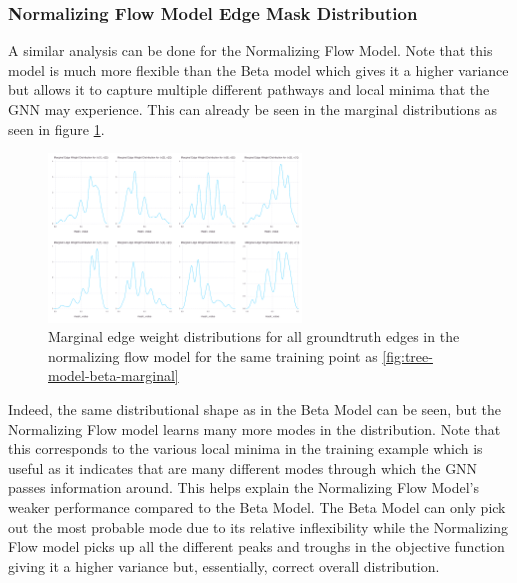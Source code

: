 \subsubsection{Normalizing Flow Model Edge Mask Distribution}
A similar analysis can be done for the Normalizing Flow Model. Note that this model is much more flexible than the Beta model which gives it a higher variance but allows it to capture multiple different pathways and local minima that the GNN may experience. This can already be seen in the marginal distributions as seen in figure \ref{fig:tree-model-dnfg-marginal}.
\begin{figure}[htb]
	\centering
	\includegraphics[width=0.6\textwidth]{images/tree-model-dnfg-marginal.pdf}
	\caption{Marginal edge weight distributions for all groundtruth edges in the normalizing flow model for the same training point as \ref{fig:tree-model-beta-marginal}}
	\label{fig:tree-model-dnfg-marginal}
\end{figure}

Indeed, the same distributional shape as in the Beta Model can be seen, but the Normalizing Flow model learns many more modes in the distribution. Note that this corresponds to the various local minima in the training example which is useful as it indicates that are many different modes through which the GNN passes information around. This helps explain the Normalizing Flow Model's weaker performance compared to the Beta Model. The Beta Model can only pick out the most probable mode due to its relative inflexibility while the Normalizing Flow model picks up all the different peaks and troughs in the objective function giving it a higher variance but, essentially, correct overall distribution.

